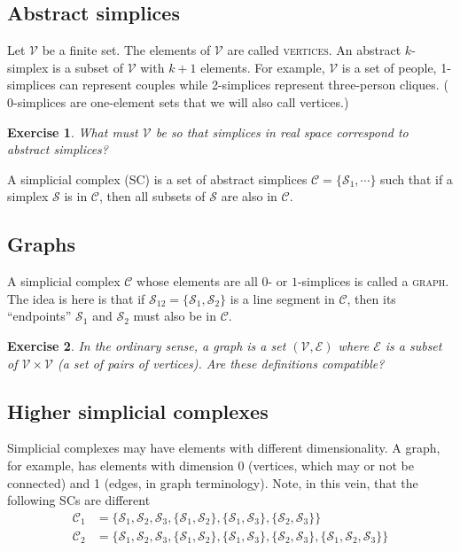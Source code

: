 \documentclass{tufte-handout}
\newtheorem{exercise}{Exercise}
\newcommand{\define}{\textsc}
\newcommand{\ve}{\mathcal{V}}
\begin{document}
\subsection{Abstract simplices}
\newcommand{\se}{\mathcal S}
\renewcommand{\sc}{\mathcal C}
Let $\ve$ be a finite set. The elements of $\ve$ are called \define{vertices}. An abstract $k$-simplex is a subset of $\ve$ with $k+1$ elements. For example, $\ve$ is a set of people, 1-simplices can represent couples while 2-simplices represent three-person cliques. ($0$-simplices are one-element sets that we will also call vertices.)

\begin{exercise}
What must $\ve$ be so that simplices in real space correspond to abstract simplices?
\end{exercise}

A simplicial complex (SC)  is a set of abstract simplices $\sc=\{\se_1,\cdots\}$ such that if a simplex $\se$ is in $\sc$, then all subsets of $\se$ are also in $\sc$. 
\subsection{Graphs}
A simplicial complex $\sc$ whose elements are all $0$- or $1$-simplices is called a \define{graph}. The idea is here is that if $\se_{12}=\{\se_1,\se_2\}$ is a line segment in $\sc$, then its ``endpoints'' $\se_1$ and $\se_2$ must also be in $\sc$. 
\begin{exercise}
In the ordinary sense, a graph is a set $(\ve,\mathcal E)$ where $\mathcal E$ is a subset of $\ve\times \ve$ (a set of pairs of vertices). Are these definitions compatible?
\end{exercise}
\subsection{Higher simplicial complexes}
Simplicial complexes may have elements with different dimensionality. A graph, for example, has elements with dimension 0 (vertices, which may or not be connected) and 1 (edges, in graph terminology). Note, in this vein, that the following SCs are different
\begin{align*}
    \sc_1 &= \{\se_1,\se_2,\se_3,\{\se_1,\se_2\},\{\se_1,\se_3\},\{\se_2,\se_3\}\}\\
    \sc_2 &= \{\se_1,\se_2,\se_3,\{\se_1,\se_2\},\{\se_1,\se_3\},\{\se_2,\se_3\},\{\se_1,\se_2,\se_3\}\}
\end{align*}
\end{document}
